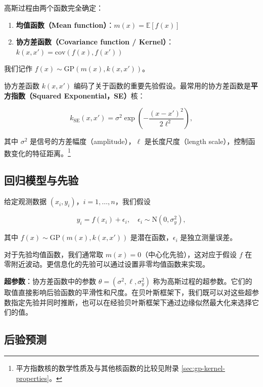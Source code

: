 高斯过程由两个函数完全确定：

\begin{enumerate}
  \item \textbf{均值函数（Mean function）}：$m(x) = \mathbb{E}[f(x)]$
  \item \textbf{协方差函数（Covariance function / Kernel）}：$k(x, x') = \mathrm{cov}(f(x), f(x'))$
\end{enumerate}

我们记作 $f(x) \sim \mathrm{GP}(m(x), k(x, x'))$。

协方差函数 $k(x, x')$ 编码了关于函数的重要先验假设。最常用的协方差函数是\textbf{平方指数（Squared Exponential，SE）}核：

\begin{equation}
k_{\mathrm{SE}}(x, x') = \sigma^2 \exp\left(-\frac{(x - x')^2}{2\ell^2}\right), \label{eq:se-kernel}
\end{equation}

其中 $\sigma^2$ 是信号的方差幅度（amplitude），$\ell$ 是长度尺度（length scale），控制函数变化的特征距离。\footnote{平方指数核的数学性质及与其他核函数的比较见附录 \cref{sec:gp-kernel-properties}。}

\subsection{回归模型与先验}

给定观测数据 $(x_i, y_i)$，$i = 1, \ldots, n$，我们假设

\begin{equation}
y_i = f(x_i) + \epsilon_i, \quad \epsilon_i \sim \mathrm{N}(0, \sigma_y^2), \label{eq:gp-observation-model}
\end{equation}

其中 $f(x) \sim \mathrm{GP}(m(x), k(x, x'))$ 是潜在函数，$\epsilon_i$ 是独立测量误差。

对于先验均值函数，我们通常取 $m(x) = 0$（中心化先验），这对应于假设 $f$ 在零附近波动。更信息化的先验可以通过设置非零均值函数来实现。

\textbf{超参数}：协方差函数中的参数 $\theta = (\sigma^2, \ell, \sigma_y^2)$ 称为高斯过程的超参数。它们的取值直接影响后验函数的平滑性和尺度。在贝叶斯框架下，我们既可以对这些超参数指定先验并同时推断，也可以在经验贝叶斯框架下通过边缘似然最大化来选择它们的值。

\subsection{后验预测}

